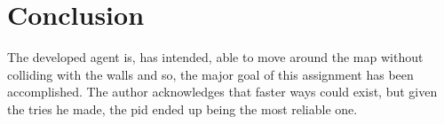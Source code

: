 \documentclass[runningheads]{llncs}
\begin{document}
\section{Conclusion}

The developed agent is, has intended, able to move around the map without colliding with the walls and so, the major goal of this assignment has been accomplished. The author acknowledges that faster ways could exist, but given the tries he made, the \gls{pid} ended up being the most reliable one.



%
%
%


%
\end{document}
